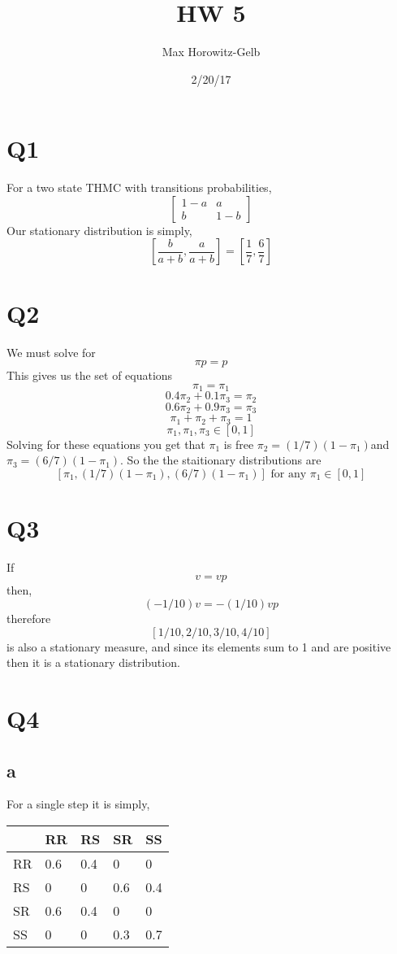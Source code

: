 \documentclass{article}
\title{HW 5}
\author{Max Horowitz-Gelb}
\date{2/20/17}
\begin{document}
\maketitle
\section*{Q1}
For a two state THMC with transitions probabilities,
\[
\begin{bmatrix}
1-a & a\\
b & 1-b
\end{bmatrix}
\]
Our stationary distribution is simply,
\[
[\frac{b}{a+b}, \frac{a}{a+b}] = [\frac{1}{7}, \frac{6}{7}]
\]

\section*{Q2}
We must solve for
\[
\pi p = p
\]
This gives us the set of equations
\[
\pi_1 = \pi_1
\]
\[
0.4\pi_2 + 0.1\pi_3 = \pi_2
\]
\[
0.6\pi_2 + 0.9\pi_3 = \pi_3
\]
\[
\pi_1 + \pi_2 + \pi_3 = 1
\]
\[
\pi_1, \pi_1, \pi_3 \in [0,1]
\]
Solving for these equations you get that $\pi_1$ is free $\pi_2 = (1/7)(1-\pi_1) $and $\pi_3 = (6/7)(1-\pi_1)$.
So the the staitionary distributions are
\[
[\pi_1, (1/7)(1-\pi_1), (6/7)(1-\pi_1)]  \text{ for any } \pi_1 \in [0,1]
\] 

\section*{Q3}
If
\[
v = vp
\]
then,
\[
(-1/10)v = -(1/10)vp
\]
therefore
\[
[1/10,2/10,3/10,4/10]
\]
is also a stationary measure, and since its elements sum to 1 and are positive then it is a stationary distribution.



\section*{Q4}

\subsection*{a}
For a single step it is simply,
\begin{tabular}{|l|l|l|l|l|}
\hline
 & RR & RS & SR & SS \\ \hline
RR & 0.6 & 0.4 & 0 & 0\\ \hline
RS & 0& 0 &0.6 & 0.4\\ \hline
SR & 0.6 & 0.4 & 0 & 0\\ \hline
SS & 0 &0 & 0.3 & 0.7 \\ \hline
\end{tabular}
\end{document}
